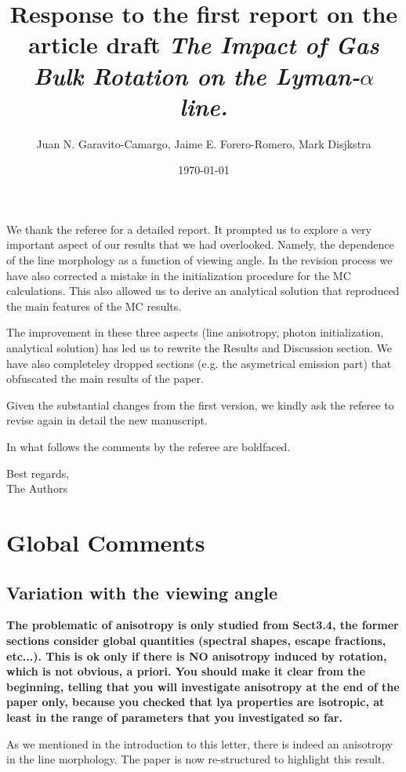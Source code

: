 \documentclass[12pt]{article}
\title{Response to the first report on the article draft \emph{The
    Impact of Gas Bulk Rotation on the Lyman-$\alpha$ line.}}
\author{Juan N. Garavito-Camargo, Jaime E. Forero-Romero, Mark Disjkstra}
\date{\today}
\begin{document}
\maketitle
We thank the referee for a detailed report. It prompted us to explore
a very important aspect of our results that we had overlooked. Namely,
the dependence of the line morphology as a function of viewing
angle. In the revision process we have also corrected a mistake in the
initialization procedure for the MC calculations. This also allowed us
to derive an analytical solution that reproduced the main features of
the MC results.  
  
The improvement in these three aspects (line anisotropy, photon initialization,
analytical solution) has led us to rewrite the Results and Discussion
section. We have also completeley dropped sections (e.g. the asymetrical emission part) that obfuscated the main results of the paper.

Given the substantial changes from the first version, 
we kindly ask the referee to revise again in detail the new manuscript. 

In what follows the comments by the referee are boldfaced.

Best regards, \\

The Authors\\




\section{Global Comments}

\subsection{Variation with the viewing angle}

{\bf The problematic of anisotropy is only studied from Sect3.4, the former
sections consider global quantities (spectral shapes, escape
fractions, etc...). This is ok only if there is NO anisotropy induced
by rotation, which is not obvious, a priori. You should make it clear
from the beginning, telling that you will investigate anisotropy at
the end of the paper only, because you checked that lya properties are
isotropic, at least in the range of parameters that you investigated
so far.}

As we mentioned in the introduction to this letter, there is indeed
an anisotropy in the line morphology. The paper is now re-structured
to highlight this result.
\end{document}
